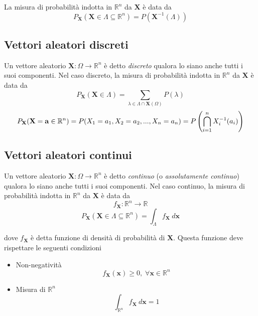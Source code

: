 \documentclass{article}
\begin{document}
        La misura di probabilità indotta in $\mathbb{R}^{n}$ da $\mathbf{X}$ è data da
        \[
            P_{\mathbf{X}}(\mathbf{X} \in \Lambda \subseteq \mathbb{R}^{n}) = P(\mathbf{X}^{-1}(\Lambda))
        \]

        \subsection{Vettori aleatori discreti}
            Un vettore aleatorio $\mathbf{X}: \Omega \rightarrow \mathbb{R}^{n}$ è detto \textit{discreto} qualora lo siano anche tutti i suoi componenti.
            Nel caso discreto, la misura di probabilità indotta in $\mathbb{R}^{n}$ da $\mathbf{X}$ è data da
            \[
                P_{\mathbf{X}}(\mathbf{X} \in \Lambda) = \sum_{\lambda \in \Lambda \cap \mathbf{X}(\Omega)} P(\lambda)
            \]
            \[
                P_{\mathbf{X}}(\mathbf{X} = \mathbf{a} \in \mathbb{R}^{n}) = P(X_{1} = a_{1}, X_{2} = a_{2}, ..., X_{n} = a_{n}) = P \qty(\bigcap_{i = 1}^{n} X_{i}^{-1}(a_{i}))
            \]

        \subsection{Vettori aleatori continui}
            Un vettore aleatorio $\mathbf{X}: \Omega \rightarrow \mathbb{R}^{n}$ è detto \textit{continuo} (o \textit{assolutamente continuo}) qualora lo siano anche tutti i suoi componenti. 
            Nel caso continuo, la misura di probabilità indotta in $\mathbb{R}^{n}$ da $\mathbf{X}$ è data da
            \[
                f_{\mathbf{X}}: \mathbb{R}^{n} \rightarrow \mathbb{R}
            \]
            \[
                P_{\mathbf{X}}(\mathbf{X} \in \Lambda \subseteq \mathbb{R}^{n}) = \int_{\Lambda} f_{\mathbf{X}} \: d\mathbf{x}
            \]

            dove $f_{\mathbf{X}}$ è detta funzione di densità di probabilità di $\mathbf{X}$.
            Questa funzione deve rispettare le seguenti condizioni
            \begin{itemize}
                \item Non-negatività
                \[
                    f_{\mathbf{X}}(\mathbf{x}) \geq 0, \; \forall \mathbf{x} \in \mathbb{R}^{n}
                \]
                \item Misura di $\mathbb{R}^{n}$
                \[
                    \int_{\mathbb{R}^{n}} f_{\mathbf{X}} \: d\mathbf{x} = 1
                \]
            \end{itemize}
\end{document}

